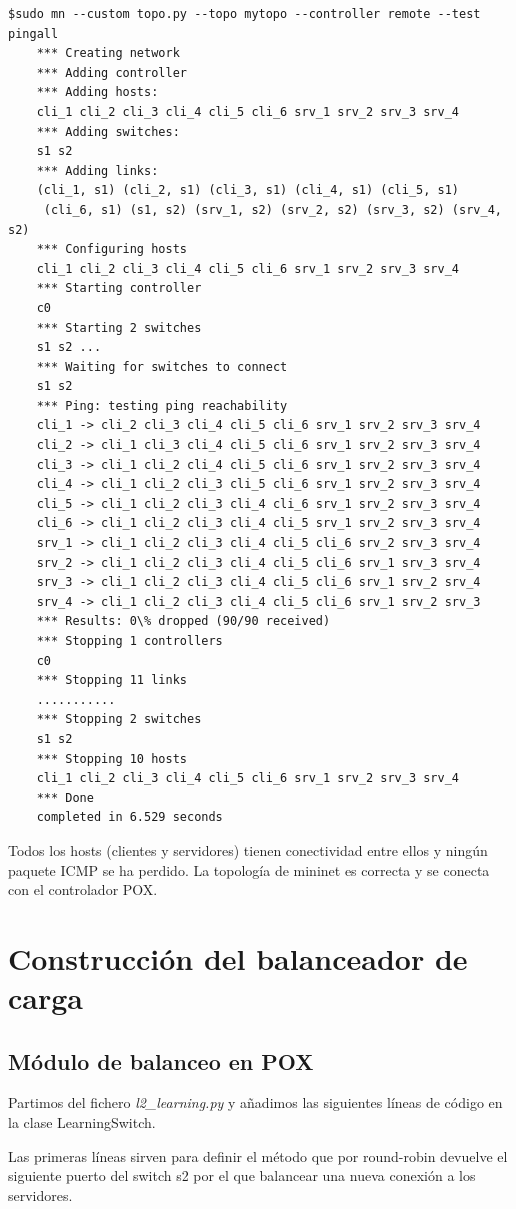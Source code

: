 \documentclass{article}
\begin{document}
\begin{Verbatim}[frame=single]
$sudo mn --custom topo.py --topo mytopo --controller remote --test pingall
	*** Creating network
	*** Adding controller
	*** Adding hosts:
	cli_1 cli_2 cli_3 cli_4 cli_5 cli_6 srv_1 srv_2 srv_3 srv_4
	*** Adding switches:
	s1 s2
	*** Adding links:
	(cli_1, s1) (cli_2, s1) (cli_3, s1) (cli_4, s1) (cli_5, s1)
	 (cli_6, s1) (s1, s2) (srv_1, s2) (srv_2, s2) (srv_3, s2) (srv_4, s2)
	*** Configuring hosts
	cli_1 cli_2 cli_3 cli_4 cli_5 cli_6 srv_1 srv_2 srv_3 srv_4
	*** Starting controller
	c0
	*** Starting 2 switches
	s1 s2 ...
	*** Waiting for switches to connect
	s1 s2
	*** Ping: testing ping reachability
	cli_1 -> cli_2 cli_3 cli_4 cli_5 cli_6 srv_1 srv_2 srv_3 srv_4
	cli_2 -> cli_1 cli_3 cli_4 cli_5 cli_6 srv_1 srv_2 srv_3 srv_4
	cli_3 -> cli_1 cli_2 cli_4 cli_5 cli_6 srv_1 srv_2 srv_3 srv_4
	cli_4 -> cli_1 cli_2 cli_3 cli_5 cli_6 srv_1 srv_2 srv_3 srv_4
	cli_5 -> cli_1 cli_2 cli_3 cli_4 cli_6 srv_1 srv_2 srv_3 srv_4
	cli_6 -> cli_1 cli_2 cli_3 cli_4 cli_5 srv_1 srv_2 srv_3 srv_4
	srv_1 -> cli_1 cli_2 cli_3 cli_4 cli_5 cli_6 srv_2 srv_3 srv_4
	srv_2 -> cli_1 cli_2 cli_3 cli_4 cli_5 cli_6 srv_1 srv_3 srv_4
	srv_3 -> cli_1 cli_2 cli_3 cli_4 cli_5 cli_6 srv_1 srv_2 srv_4
	srv_4 -> cli_1 cli_2 cli_3 cli_4 cli_5 cli_6 srv_1 srv_2 srv_3
	*** Results: 0\% dropped (90/90 received)
	*** Stopping 1 controllers
	c0
	*** Stopping 11 links
	...........
	*** Stopping 2 switches
	s1 s2
	*** Stopping 10 hosts
	cli_1 cli_2 cli_3 cli_4 cli_5 cli_6 srv_1 srv_2 srv_3 srv_4
	*** Done
	completed in 6.529 seconds
\end{Verbatim}

Todos los hosts (clientes y servidores) tienen conectividad entre ellos y ningún paquete ICMP se ha perdido. La topología de mininet es correcta y se conecta con el controlador POX.

\section{Construcción del balanceador de carga}

\subsection{Módulo de balanceo en POX}

Partimos del fichero \textit{l2\_learning.py} y añadimos las siguientes líneas de código en la clase LearningSwitch.

Las primeras líneas sirven para definir el método que por round-robin devuelve el siguiente puerto del switch s2 por el que balancear una nueva conexión a los servidores.
\end{document}
